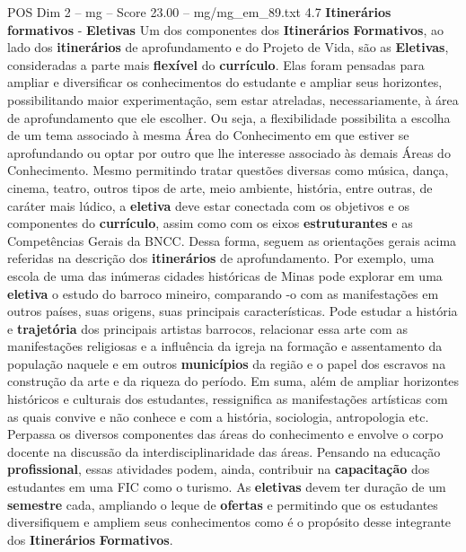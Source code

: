 \begin{textsample}{POS Dim 2 – mg – Score 23.00 – mg/mg\_em\_89.txt}  \label{ex:f2_pos_200}
4.7 \textbf{Itinerários} \textbf{formativos} - \textbf{Eletivas} Um dos componentes dos \textbf{Itinerários} \textbf{Formativos}, ao lado dos \textbf{itinerários} de aprofundamento e do Projeto de Vida, são as \textbf{Eletivas}, consideradas a parte mais \textbf{flexível} do \textbf{currículo}.
Elas foram pensadas para ampliar e diversificar os conhecimentos do estudante e ampliar seus horizontes, possibilitando maior experimentação, sem estar atreladas, necessariamente, à área de aprofundamento que ele escolher.
Ou seja, a flexibilidade possibilita a escolha de um tema associado à mesma Área do Conhecimento em que estiver se aprofundando ou optar por outro que lhe interesse associado às demais Áreas do Conhecimento.
Mesmo permitindo tratar questões diversas como música, dança, cinema, teatro, outros tipos de arte, meio ambiente, história, entre outras, de caráter mais lúdico, a \textbf{eletiva} deve estar conectada com os objetivos e os componentes do \textbf{currículo}, assim como com os eixos \textbf{estruturantes} e as Competências Gerais da BNCC.
Dessa forma, seguem as orientações gerais acima referidas na descrição dos \textbf{itinerários} de aprofundamento.
Por exemplo, uma escola de uma das inúmeras cidades históricas de Minas pode explorar em uma \textbf{eletiva} o estudo do barroco mineiro, comparando -o com as manifestações em outros países, suas origens, suas principais características.
Pode estudar a história e \textbf{trajetória} dos principais artistas barrocos, relacionar essa arte com as manifestações religiosas e a influência da igreja na formação e assentamento da população naquele e em outros \textbf{municípios} da região e o papel dos escravos na construção da arte e da riqueza do período.
Em suma, além de ampliar horizontes históricos e culturais dos estudantes, ressignifica as manifestações artísticas com as quais convive e não conhece e com a história, sociologia, antropologia etc.
Perpassa os diversos componentes das áreas do conhecimento e envolve o corpo docente na discussão da interdisciplinaridade das áreas.
Pensando na educação \textbf{profissional}, essas atividades podem, ainda, contribuir na \textbf{capacitação} dos estudantes em uma FIC como o turismo.
As \textbf{eletivas} devem ter duração de um \textbf{semestre} cada, ampliando o leque de \textbf{ofertas} e permitindo que os estudantes diversifiquem e ampliem seus conhecimentos como é o propósito desse integrante dos \textbf{Itinerários} \textbf{Formativos}.

\end{textsample}
